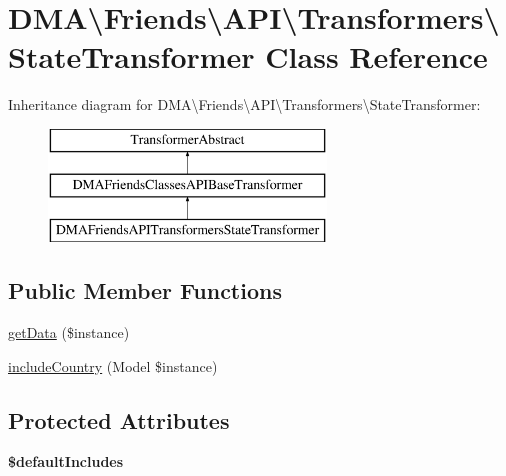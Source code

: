 \hypertarget{classDMA_1_1Friends_1_1API_1_1Transformers_1_1StateTransformer}{}\section{D\+M\+A\textbackslash{}Friends\textbackslash{}A\+P\+I\textbackslash{}Transformers\textbackslash{}State\+Transformer Class Reference}
\label{classDMA_1_1Friends_1_1API_1_1Transformers_1_1StateTransformer}
Inheritance diagram for D\+M\+A\textbackslash{}Friends\textbackslash{}A\+P\+I\textbackslash{}Transformers\textbackslash{}State\+Transformer\+:\begin{figure}[H]
\begin{center}
\leavevmode
\includegraphics[height=3.000000cm]{de/de0/classDMA_1_1Friends_1_1API_1_1Transformers_1_1StateTransformer}
\end{center}
\end{figure}
\subsection*{Public Member Functions}
\begin{DoxyCompactItemize}
\item 
\hyperlink{classDMA_1_1Friends_1_1API_1_1Transformers_1_1StateTransformer_a46336282d30845ae189715cfee04be15}{get\+Data} (\$instance)
\item 
\hyperlink{classDMA_1_1Friends_1_1API_1_1Transformers_1_1StateTransformer_aa5b7cf3a2ea5908778ee989979295e35}{include\+Country} (Model \$instance)
\end{DoxyCompactItemize}
\subsection*{Protected Attributes}
\begin{DoxyCompactItemize}
\item 
{\bfseries \$default\+Includes}
\end{DoxyCompactItemize}

